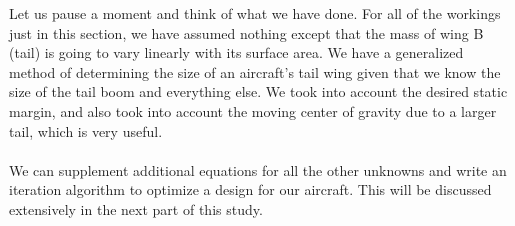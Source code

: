 Let us pause a moment and think of what we have done. For all of the workings just in this section, we have assumed nothing except that the mass of wing B (tail) is going to vary linearly with its surface area. We have a generalized method of determining the size of an aircraft's tail wing given that we know the size of the tail boom and everything else. We took into account the desired static margin, and also took into account the moving center of gravity due to a larger tail, which is very useful.
\\~\\We can supplement additional equations for all the other unknowns and write an iteration algorithm to optimize a design for our aircraft. This will be discussed extensively in the next part of this study.

\begin{comment}
Develop Expression for Overall CG
Use Static Margin to Determine position of the desired Neutral Point
Develop Expression for location of Neutral Point, given location of neutral points of the wings, and lift curve slopes for each wing
Compute the Downforce Needed to balance the aircraft based on Moments about CG Overall being zero.
Develop Cost function as Downforce + Weight of Tail Section
Differentiate based on surface Area of tail, figure out optimum surface Area of tail
Figure out the rest of all the other variables

We can supplement approximate location of neutral point with 0.3 from avl experimentation
We can supplement the lift curve slope using the approximation that was verified to be correct

Fixed variables:
Main Wing Completely Fixed
Aspect Ratio of Tail is Fixed, just need to size Area
Trim Angle, and hence, Lift, Moments of Main Wing
\end{comment}


